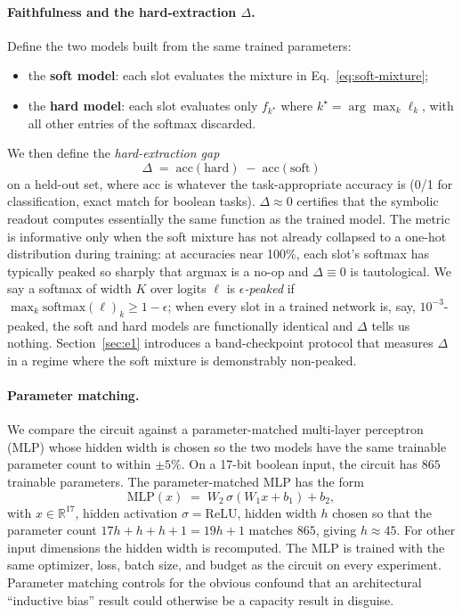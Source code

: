 \documentclass{article}
\newcommand{\R}{\mathbb{R}}
\begin{document}
\paragraph{Faithfulness and the hard-extraction $\Delta$.}
Define the two models built from the same trained parameters:
\begin{itemize}
  \item the \textbf{soft model}: each slot evaluates the mixture in Eq.~\ref{eq:soft-mixture};
  \item the \textbf{hard model}: each slot evaluates only $f_{k^\star}$ where $k^\star = \arg\max_k \ell_k$, with all other entries of the softmax discarded.
\end{itemize}
We then define the \emph{hard-extraction gap}
\begin{equation}
  \Delta \;=\; \mathrm{acc}(\text{hard}) \;-\; \mathrm{acc}(\text{soft})
  \label{eq:delta}
\end{equation}
on a held-out set, where $\mathrm{acc}$ is whatever the task-appropriate accuracy is (0/1 for classification, exact match for boolean tasks).
$\Delta \approx 0$ certifies that the symbolic readout computes essentially the same function as the trained model.
The metric is informative only when the soft mixture has not already collapsed to a one-hot distribution during training: at accuracies near 100\%, each slot's softmax has typically peaked so sharply that argmax is a no-op and $\Delta \equiv 0$ is tautological.
We say a softmax of width $K$ over logits $\boldsymbol{\ell}$ is \emph{$\epsilon$-peaked} if $\max_k \mathrm{softmax}(\boldsymbol{\ell})_k \ge 1 - \epsilon$; when every slot in a trained network is, say, $10^{-3}$-peaked, the soft and hard models are functionally identical and $\Delta$ tells us nothing.
Section~\ref{sec:e1} introduces a band-checkpoint protocol that measures $\Delta$ in a regime where the soft mixture is demonstrably non-peaked.

\paragraph{Parameter matching.}
We compare the circuit against a parameter-matched multi-layer perceptron (MLP) whose hidden width is chosen so the two models have the same trainable parameter count to within $\pm 5\%$.
On a 17-bit boolean input, the circuit has $865$ trainable parameters.
The parameter-matched MLP has the form
\begin{equation*}
  \text{MLP}(x) \;=\; W_2 \,\sigma\!\left(W_1 x + b_1\right) + b_2,
\end{equation*}
with $x \in \R^{17}$, hidden activation $\sigma = \mathrm{ReLU}$, hidden width $h$ chosen so that the parameter count $17h + h + h + 1 = 19h + 1$ matches $865$, giving $h \approx 45$.
For other input dimensions the hidden width is recomputed.
The MLP is trained with the same optimizer, loss, batch size, and budget as the circuit on every experiment.
Parameter matching controls for the obvious confound that an architectural ``inductive bias'' result could otherwise be a capacity result in disguise.
\end{document}
